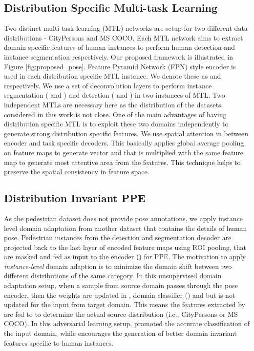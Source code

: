 \documentclass[a4paper,11pt]{article}
\begin{document}
\subsection{Distribution Specific Multi-task Learning}
Two distinct multi-task learning (MTL) networks are setup for two different data distributions - CityPersons and MS COCO. Each MTL network aims to extract domain specific features of human instances to perform human detection and instance segmentation respectively. Our proposed framework is illustrated in Figure \ref{fig:proposed_pose}. Feature Pyramid Network (FPN) style encoder is used in each distribution specific MTL instance. We denote these as  and  respectively. We use a set of deconvolution layers to perform instance segmentation ( and ) and detection  ( and ) in two instances of MTL. Two independent MTLs are necessary here as the distribution of the datasets considered in this work is not close. One of the main advantages of having distribution specific MTL is to exploit these two domains independently to generate strong distribution specific features. We use spatial attention in between encoder and task specific decoders. This basically applies global average pooling on feature maps to generate vector and that is multiplied with the same feature map to generate most attentive area from the features. This technique helps to preserve the spatial consistency in feature space.

\subsection{Distribution Invariant PPE}
As the pedestrian dataset does not provide pose annotations, we apply instance level domain adaptation from another dataset that contains the details of human pose. Pedestrian instances from the detection and segmentation decoder are projected back to the last layer of encoded feature maps using ROI pooling, that are masked and fed as input to the encoder () for PPE. The motivation to apply \textit{instance-level} domain adaption is to minimize the domain shift between two different distributions of the same category.  In this unsupervised domain adaptation setup, when a sample from source domain passes through the pose encoder, then the weights are updated in , domain classifier () and  but  is not updated for the input from target domain. This means the features extracted by  are fed to  to determine the actual source distribution (i.e., CityPersons or MS COCO). In this adversarial learning setup,  promoted the accurate classification of the input domain, while  encourages the generation of better domain invariant features specific to human instances.
\end{document}
